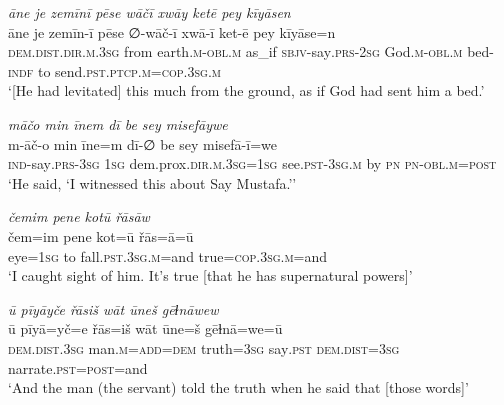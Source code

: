 \ea \label{ŽP.69}
\textit{āne je zemīnī pēse wāčī xwāy ketē pey kīyāsen} \\ 
\gll āne je zemīn-ī pēse ∅-wāč-ī xwā-ī ket-ē pey kīyāse=n \\ 
 \textsc{dem.dist}\textsc{.dir}\textsc{.m}\textsc{.3sg} from earth\textsc{.m}\textsc{-obl}\textsc{.m} as\_if \textsc{sbjv-}say\textsc{.prs-}\textsc{2sg} God\textsc{.m}\textsc{-obl}\textsc{.m} bed\textsc{-indf} to send\textsc{.pst}\textsc{.ptcp}\textsc{.m}\textsc{=cop}\textsc{.3sg}\textsc{.m} \\ 
\glt `[He had levitated] this much from the ground, as if God had sent him a bed.'
\z 
 
\ea \label{ŽP.74}
\textit{māčo min īnem dī be sey misefāywe} \\ 
\gll m-āč-o min īne=m dī-∅ be sey misefā-ī=we \\ 
 \textsc{ind-}say\textsc{.prs}\textsc{-3sg} \textsc{1sg} dem.prox\textsc{.dir}\textsc{.m}\textsc{.3sg}\textsc{=\textsc{1sg}} see\textsc{.pst}\textsc{-3sg}\textsc{.m} by \textsc{pn} \textsc{pn}\textsc{-obl}\textsc{.m}\textsc{=\textsc{post}} \\ 
\glt `He said, ‘I witnessed this about Say Mustafa.’'
\z 
 
\ea \label{ŽP.76}
\textit{čemim pene kotū řāsāw} \\ 
\gll čem=im pene kot=ū řās=ā=ū \\ 
 eye\textsc{=\textsc{1sg}} to fall\textsc{.pst}\textsc{.3sg}\textsc{.m}=and true\textsc{=cop}\textsc{.3sg}\textsc{.m}=and \\ 
\glt `I caught sight of him. It’s true [that he has supernatural powers]'
\z 
 
\ea \label{ŽP.77}
\textit{ū pīyāyče řāsiš wāt ūneš gēɫnāwew} \\ 
\gll ū pīyā=yč=e řās=iš wāt ūne=š gēɫnā=we=ū \\ 
 \textsc{dem.dist}\textsc{.3sg} man\textsc{.m}\textsc{=add}\textsc{=dem} truth\textsc{=3sg} say\textsc{.pst} \textsc{dem.dist}\textsc{=3sg} narrate\textsc{.pst}\textsc{=\textsc{post}}=and \\ 
\glt `And the man (the servant) told the truth when he said that [those words]'
\z 
 
